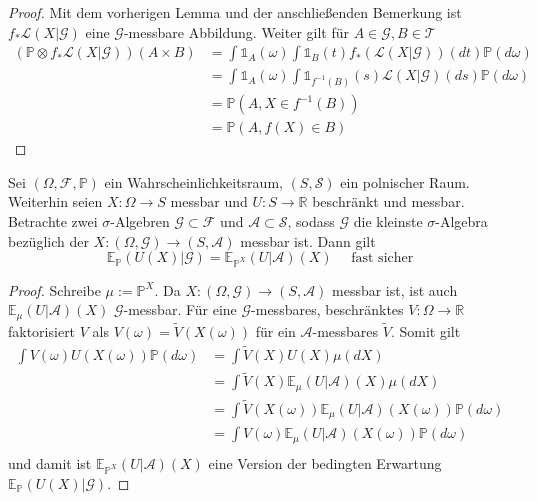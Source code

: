 \begin{proof}
Mit dem vorherigen Lemma und der anschließenden Bemerkung ist $f_*\mathcal{L}(X\vert\mathcal{G})$ eine $\mathcal{G}$-messbare Abbildung. Weiter gilt für $A\in\mathcal{G}, B\in\mathcal{T}$
\begin{align*}
    (\mathbb{P}\otimes f_*\mathcal{L}(X\vert \mathcal{G}))(A\times B) &= \int \mathds{1}_A(\omega) \int \mathds{1}_B(t) f_*(\mathcal{L}(X\vert\mathcal{G}))(dt) \mathbb{P}(d\omega) \\
    &= \int \mathds{1}_A(\omega) \int \mathds{1}_{f^{-1}(B)}(s)\mathcal{L}(X\vert\mathcal{G})(ds) \mathbb{P}(d\omega) \\
    &= \mathbb{P}(A, X\in f^{-1}(B)) \\
    &= \mathbb{P}(A, f(X) \in B)
\end{align*}
\end{proof}

\begin{lemma}\label{thm:pushforward_expectancy}
Sei $(\Omega, \mathcal{F}, \mathbb{P})$ ein Wahrscheinlichkeitsraum, $(S, \mathcal{S})$ ein polnischer Raum. Weiterhin seien $X: \Omega \rightarrow S$ messbar und $U: S\rightarrow \mathbb{R}$ beschränkt und messbar. Betrachte zwei $\sigma$-Algebren $\mathcal{G}\subset \mathcal{F}$ und $\mathcal{A} \subset \mathcal{S}$, sodass $\mathcal{G}$ die kleinste $\sigma$-Algebra bezüglich der $X: (\Omega, \mathcal{G}) \rightarrow (S, \mathcal{A})$ messbar ist. Dann gilt
$$\mathbb{E}_{\mathbb{P}}(U(X) \vert \mathcal{G}) = \mathbb{E}_{\mathbb{P}^X}(U \vert \mathcal{A})(X) \quad \text{ fast sicher}$$
\end{lemma}
\begin{proof}
Schreibe $\mu := \mathbb{P}^X$. Da $X: (\Omega, \mathcal{G}) \rightarrow (S, \mathcal{A})$ messbar ist, ist auch $\mathbb{E}_\mu(U\vert \mathcal{A})(X)$ $\mathcal{G}$-messbar. Für eine $\mathcal{G}$-messbares, beschränktes $V:\Omega \rightarrow \mathbb{R}$ faktorisiert $V$ als $V(\omega) = \tilde{V}(X(\omega))$ für ein $\mathcal{A}$-messbares $\tilde{V}$. Somit gilt
\begin{align*}
\int V(\omega)U(X(\omega))\mathbb{P}(d\omega) &= \int \tilde{V}(X)U(X) \mu(dX)  \\
&= \int \tilde{V}(X)\mathbb{E}_\mu(U \vert \mathcal{A})(X) \mu(dX) \\
&= \int \tilde{V}(X(\omega)) \mathbb{E}_\mu(U \vert \mathcal{A})(X(\omega)) \mathbb{P}(d\omega) \\
&= \int V(\omega) \mathbb{E}_\mu(U \vert \mathcal{A})(X(\omega)) \mathbb{P}(d\omega) \\
\end{align*}
und damit ist $\mathbb{E}_{\mathbb{P}^{X}}(U \vert \mathcal{A})(X)$ eine Version der bedingten Erwartung $\mathbb{E}_{\mathbb{P}}(U(X) \vert \mathcal{G})$.
\end{proof}

